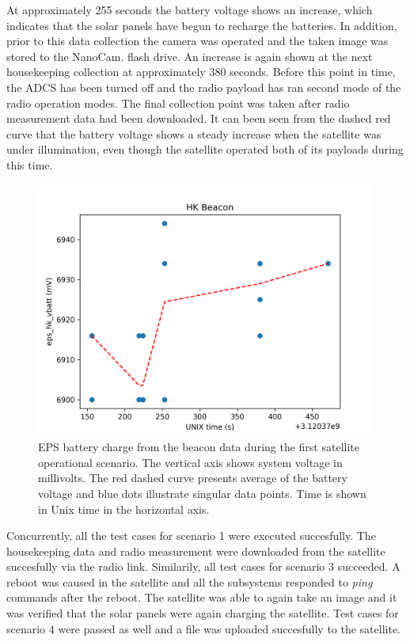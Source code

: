\documentclass[english,12pt,a4paper,pdftex,elec,utf8]{aaltothesis}
\begin{document}
At approximately 255 seconds the battery voltage shows an increase, which indicates that the solar panels have begun to recharge the batteries. In addition, prior to this data collection the camera was operated and the taken image was stored to the NanoCam. flash drive. An increase is again shown at the next housekeeping collection at approximately 380 seconds. Before this point in time, the ADCS has been turned off and the radio payload has ran second mode of the radio operation modes. The final collection point was taken after radio measurement data had been downloaded. It can been seen from the dashed red curve that the battery voltage shows a steady increase when the satellite was under illumination, even though the satellite operated both of its payloads during this time.  
\par
\begin{figure}[h!]
\centering
%
\includegraphics[scale=0.7]{hk_plot1_mod}
\caption{EPS battery charge from the beacon data during the first satellite operational scenario. The vertical axis shows system voltage in millivolts. The red dashed curve presents average of the battery voltage and blue dots illustrate singular data points. Time is shown in Unix time in the horizontal axis. }
\label{epsvbatt}
\end{figure}  
Concurrently, all the test cases for scenario 1 were executed succesfully. The housekeeping data and radio measurement were downloaded from the satellite succesfully via the radio link. Similarily, all test cases for scenario 3 succeeded. A reboot was caused in the satellite and all the subsystems responded to \textit{ping} commands after the reboot. The satellite was able to again take an image and it was verified that the solar panels were again charging the satellite. Test cases for scenario 4 were passed as well and a file was uploaded succesfully to the satellite.\par 
\end{document}
